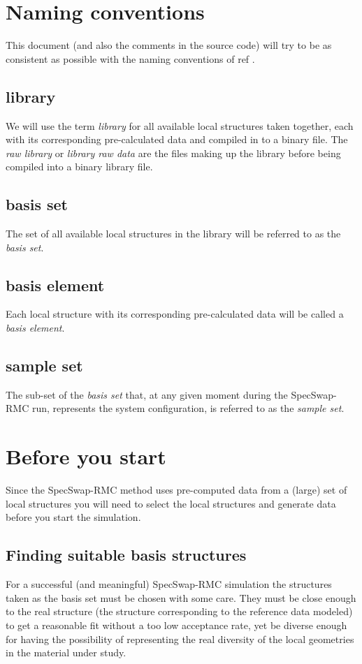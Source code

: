 \documentclass[a4paper, 10pt]{article}
\begin{document}
\section{Naming conventions}
This document (and also the comments in the source code) will try to
be as consistent as possible with the naming
conventions of ref \cite{SS-RMC}.

\subsection{library}
We will use the term {\it library} for
all available local structures taken together, each with its
corresponding pre-calculated data and compiled in to a binary
file. The {\it raw library} or {\it library raw data} are the files
making up the library before being compiled into a binary library
file.

\subsection{basis set}
The set of all available local structures in the library
 will be referred to as the {\it basis set}.

\subsection{basis element}
Each local structure with
 its corresponding pre-calculated data will be called a {\it basis
   element}.

\subsection{sample set}
The sub-set of the {\it basis set} that, at any
 given moment during the SpecSwap-RMC run, represents the system
 configuration, is referred to as the {\it sample set}.

\section{Before you start}
Since the SpecSwap-RMC method uses pre-computed data from a (large)
set of local structures you will need to select the local structures
and generate data before you start the simulation.

\subsection{Finding suitable basis structures}
For a successful (and meaningful) SpecSwap-RMC simulation the
structures taken as the basis set must be chosen with some care.
They must be close enough to the real structure (the structure
corresponding to the reference data modeled) to get a reasonable fit
without a too low acceptance rate, yet be diverse enough
for having the possibility of representing the real diversity of the
local geometries in the material under study.
\end{document}
